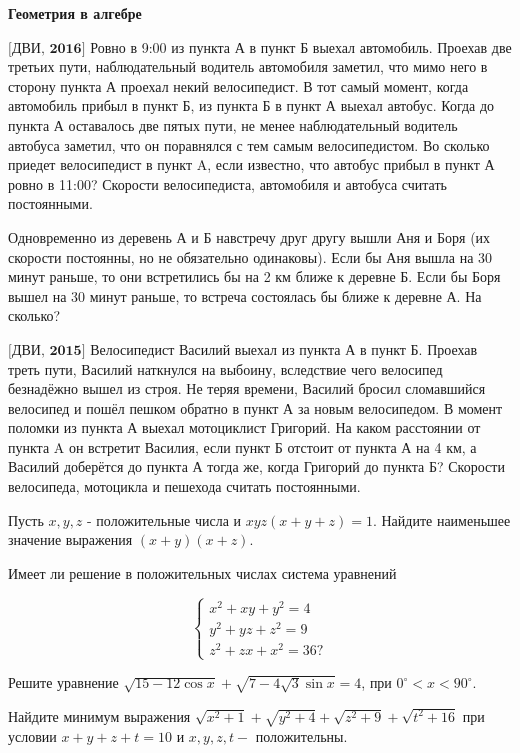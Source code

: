 \centerline{\bf \Huge Геометрия в алгебре}

$\bigl[\textbf{ДВИ, 2016}\bigr]$
Ровно в 9:00 из пункта А в пункт Б выехал автомобиль. Проехав две третьих пути, наблюдательный водитель автомобиля заметил, что мимо него в сторону пункта А проехал некий велосипедист. В тот самый момент, когда автомобиль прибыл в пункт Б, из пункта Б в пункт А выехал автобус. Когда до пункта А оставалось две пятых пути, не менее наблюдательный водитель автобуса заметил, что он поравнялся с тем самым велосипедистом. Во сколько приедет велосипедист в пункт A, если известно, что автобус прибыл в пункт А ровно в 11:00? Скорости велосипедиста, автомобиля и автобуса считать постоянными.

 Одновременно из деревень А и Б навстречу друг другу вышли Аня и Боря (их скорости постоянны, но не обязательно одинаковы). Если бы Аня вышла на 30 минут раньше, то они встретились бы на 2 км ближе к деревне Б. Если бы Боря вышел на 30 минут раньше, то встреча состоялась бы ближе к деревне А. На сколько?

$\bigl[\textbf{ДВИ, 2015}\bigr]$
Велосипедист Василий выехал из пункта А в пункт Б. Проехав треть пути, Василий наткнулся на выбоину, вследствие чего велосипед безнадёжно вышел из строя. Не теряя времени, Василий бросил сломавшийся велосипед и пошёл пешком обратно в пункт А за новым велосипедом. В момент поломки из пункта А выехал мотоциклист Григорий. На каком расстоянии от пункта A он встретит Василия, если пункт Б отстоит от пункта А на 4 км, а Василий доберётся до пункта А тогда же, когда Григорий до пункта Б? Скорости велосипеда, мотоцикла и пешехода считать постоянными.

Пусть $x, y, z$ - положительные числа и $x y z(x+y+z)=1$. Найдите наименьшее значение выражения $(x+y)(x+z)$.


Имеет ли решение в положительных числах система уравнений

$$
\left\{\begin{array}{l}
x^2+x y+y^2=4 \\
y^2+y z+z^2=9 \\
z^2+z x+x^2=36 ?
\end{array}\right.
$$

Решите уравнение $\sqrt{15-12 \cos x}+\sqrt{7-4 \sqrt{3} \sin x}=4$, при $0^{\circ}<x<90^{\circ}$.

Найдите минимум выражения $\sqrt{x^2+1}+\sqrt{y^2+4}+\sqrt{z^2+9}+\sqrt{t^2+16}$ при условии $x+y+z+t=10$ и $x, y, z, t-$ положительны.